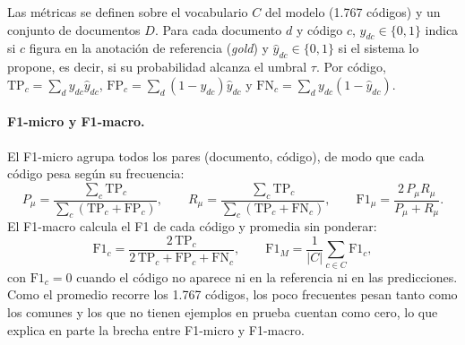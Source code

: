 Las métricas se definen sobre el vocabulario $C$ del modelo (1.767 códigos) y un conjunto de documentos $D$. Para cada documento $d$ y código $c$, $y_{dc}\in\{0,1\}$ indica si $c$ figura en la anotación de referencia (\emph{gold}) y $\hat{y}_{dc}\in\{0,1\}$ si el sistema lo propone, es decir, si su probabilidad alcanza el umbral $\tau$. Por código, $\mathrm{TP}_c=\sum_d y_{dc}\hat{y}_{dc}$, $\mathrm{FP}_c=\sum_d (1-y_{dc})\hat{y}_{dc}$ y $\mathrm{FN}_c=\sum_d y_{dc}(1-\hat{y}_{dc})$.

\paragraph{F1-micro y F1-macro.} El F1-micro agrupa todos los pares (documento, código), de modo que cada código pesa según su frecuencia:
\begin{equation}
P_{\mu}=\frac{\sum_c \mathrm{TP}_c}{\sum_c (\mathrm{TP}_c+\mathrm{FP}_c)},\qquad R_{\mu}=\frac{\sum_c \mathrm{TP}_c}{\sum_c (\mathrm{TP}_c+\mathrm{FN}_c)},\qquad \mathrm{F1}_{\mu}=\frac{2\,P_{\mu}R_{\mu}}{P_{\mu}+R_{\mu}}.
\end{equation}
El F1-macro calcula el F1 de cada código y promedia sin ponderar:
\begin{equation}
\mathrm{F1}_c=\frac{2\,\mathrm{TP}_c}{2\,\mathrm{TP}_c+\mathrm{FP}_c+\mathrm{FN}_c},\qquad \mathrm{F1}_{M}=\frac{1}{|C|}\sum_{c\in C}\mathrm{F1}_c,
\end{equation}
con $\mathrm{F1}_c=0$ cuando el código no aparece ni en la referencia ni en las predicciones. Como el promedio recorre los 1.767 códigos, los poco frecuentes pesan tanto como los comunes y los que no tienen ejemplos en prueba cuentan como cero, lo que explica en parte la brecha entre F1-micro y F1-macro.

